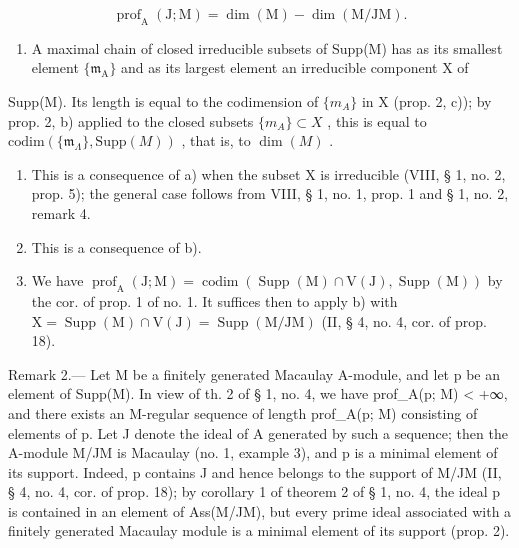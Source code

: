 \[
\operatorname{prof} _ {\mathrm{A}} (\mathrm{J}; \mathrm{M}) = \dim (\mathrm{M}) - \dim (\mathrm{M} / \mathrm{JM}).
\]

\begin{enumerate}
\def\labelenumi{\alph{enumi})}
\tightlist
\item
  A maximal chain of closed irreducible subsets of Supp(M) has as its smallest element \(\{\mathfrak{m}_{\mathrm{A}}\}\) and as its largest element an irreducible component X of
\end{enumerate}

Supp(M). Its length is equal to the codimension of \(\{m_{A}\}\) in X (prop. 2, c)); by prop. 2, b) applied to the closed subsets \(\{m_{A}\}\subset X\) , this is equal to \(\text{codim}(\{\mathfrak{m}_{\Lambda}\},\text{Supp}(M))\) , that is, to \(\dim(M)\) .

\begin{enumerate}
\def\labelenumi{\alph{enumi})}
\setcounter{enumi}{1}
\item
  This is a consequence of a) when the subset X is irreducible (VIII, § 1, no. 2, prop. 5); the general case follows from VIII, § 1, no. 1, prop. 1 and § 1, no. 2, remark 4.
\item
  This is a consequence of b).
\item
  We have \(\operatorname{prof}_{\mathrm{A}}(\mathrm{J};\mathrm{M}) = \operatorname{codim}(\operatorname{Supp}(\mathrm{M})\cap \mathrm{V}(\mathrm{J}),\operatorname{Supp}(\mathrm{M}))\) by the cor. of prop. 1 of no. 1. It suffices then to apply b) with \(\mathrm{X} = \operatorname{Supp}(\mathrm{M})\cap \mathrm{V}(\mathrm{J}) = \operatorname{Supp}(\mathrm{M} / \mathrm{JM})\) (II, § 4, no. 4, cor. of prop. 18).
\end{enumerate}

Remark 2.--- Let M be a finitely generated Macaulay A-module, and let p be an element of Supp(M). In view of th. 2 of § 1, no. 4, we have prof\_A(p; M) \textless{} +∞, and there exists an M-regular sequence of length prof\_A(p; M) consisting of elements of p. Let J denote the ideal of A generated by such a sequence; then the A-module M/JM is Macaulay (no. 1, example 3), and p is a minimal element of its support. Indeed, p contains J and hence belongs to the support of M/JM (II, § 4, no. 4, cor. of prop. 18); by corollary 1 of theorem 2 of § 1, no. 4, the ideal p is contained in an element of Ass(M/JM), but every prime ideal associated with a finitely generated Macaulay module is a minimal element of its support (prop. 2).
\relax{}

